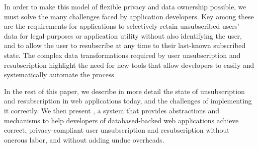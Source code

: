 In order to make this model of flexible privacy and data ownership possible, we must solve the many
challenges faced by application developers. Key among these are the requirements for applications to
selectively retain unsubscribed users' data for legal purposes or application utility without also
identifying the user, and to allow the user to resubscribe at any time to their last-known
subscribed state. The complex data transformations required by user unsubscription and
resubscription highlight the need for new tools that allow developers to easily and systematically
automate the process.

In the rest of this paper, we describe in more detail the state of unsubscription and resubscription in
web applications today, and the challenges of implementing it correctly.  We then present \sys, a
system that provides abstractions and mechanisms to help developers of databased-backed web
applications achieve correct, privacy-compliant user unsubscription and resubscription without
onerous labor, and without adding undue overheads.
